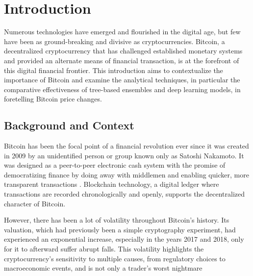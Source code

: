 \def\baselinestretch{1}

\chapter{Introduction}

\def\baselinestretch{1.44}


Numerous technologies have emerged and flourished in the digital age, but few have been as ground-breaking and divisive as cryptocurrencies. Bitcoin, a decentralized cryptocurrency that has challenged established monetary systems and provided an alternate means of financial transaction, is at the forefront of this digital financial frontier. This introduction aims to contextualize the importance of Bitcoin and examine the analytical techniques, in particular the comparative effectiveness of tree-based ensembles and deep learning models, in foretelling Bitcoin price changes. 
   

\smallskip

\goodbreak
\section{Background and Context}

Bitcoin has been the focal point of a financial revolution ever since it was created in 2009 by an unidentified person or group known only as Satoshi Nakamoto. It was designed as a peer-to-peer electronic cash system with the promise of democratizing finance by doing away with middlemen and enabling quicker, more transparent transactions \citep{article}. Blockchain technology, a digital ledger where transactions are recorded chronologically and openly, supports the decentralized character of Bitcoin.

\smallskip

However, there has been a lot of volatility throughout Bitcoin's history. Its valuation, which had previously been a simple cryptography experiment, had experienced an exponential increase, especially in the years 2017 and 2018, only for it to afterward suffer abrupt falls. This volatility highlights the cryptocurrency's sensitivity to multiple causes, from regulatory choices to macroeconomic events, and is not only a trader's worst nightmare\citep{GANDAL201886}

